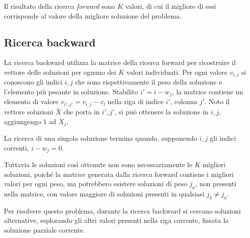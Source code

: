 Il risultato della ricerca \emph{forward} sono $K$ valori, di cui il migliore
di essi corrisponde al valore della migliore soluzione del problema.

\subsection{Ricerca backward}

La ricerca backward utilizza la matrice della ricerca forward per ricostruire
il vettore delle soluzioni per ognuno dei $K$ valori individuati. Per ogni
valore $v_{i,j}$ si conoscono gli indici $i,j$ che sono rispettivamente il peso
della soluzione e l'elemento più pesante in soluzione. Stabilito $i' = i -
w_j$, la matrice contiene un elemento di valore $v_{i',j'} = v_{i,j} - v_l$
nella riga di indice $i'$, colonna $j'$. Noto il vettore soluzioni $\bar{X}$
che porta in ${i',j'}$, si può ottenere la soluzione in ${i,j}$, aggiungengo
$1$ ad $X_j$.

La ricerca di una singola soluzione termina quando, supponendo $i,j$ gli indici
correnti, $i - w_j = 0$.

Tuttavia le soluzioni cos\`i ottenute non sono necessariamente le $K$ migliori
soluzioni, poich\'e la matrice generata dalla ricerca forward contiene i
migliori valori per ogni peso, ma potrebbero esistere soluzioni di peso $j_a$,
non presenti nella matrice, con valore maggiore di soluzioni presenti in
qualsiasi $j_b \neq j_a$.

Per risolvere questo problema, durante la ricerca backward si cercano soluzioni
alternative, esplorando gli altri valori presenti nella riga corrente, fissata
la soluzione parziale corrente.

